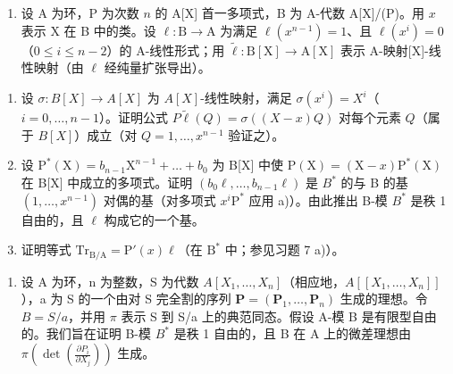 \begin{enumerate}
\def\labelenumi{\arabic{enumi})}
\setcounter{enumi}{7}
\tightlist
\item
  设 A 为环，P 为次数 \(n\) 的 A{[}X{]} 首一多项式，B 为 A-代数 A{[}X{]}/(P)。用 \(x\) 表示 X 在 B 中的类。设 \(\ell: \mathrm{B} \to \mathrm{A}\) 为满足 \(\ell(x^{n-1}) = 1\)、且 \(\ell(x^i) = 0\)（\(0 \leqslant i \leqslant n-2\)）的 A-线性形式；用 \(\tilde{\ell}: \mathrm{B}[\mathrm{X}] \to \mathrm{A}[\mathrm{X}]\) 表示 A-映射{[}X{]}-线性映射（由 \(\ell\) 经纯量扩张导出）。
\end{enumerate}

\begin{enumerate}
\def\labelenumi{\alph{enumi})}
\item
  设 \(\sigma : B[X] \to A[X]\) 为 \(A[X]\)-线性映射，满足 \(\sigma(x^i) = X^i\)（\(i = 0, \ldots, n - 1\)）。证明公式 \(P\tilde{\ell}(Q) = \sigma((X - x)Q)\) 对每个元素 \(Q\)（属于 \(B[X]\)）成立（对 \(Q = 1, \ldots, x^{n-1}\) 验证之）。
\item
  设 \(\mathrm{P}^{*}(\mathrm{X}) = b_{n-1}\mathrm{X}^{n-1} + \ldots + b_{0}\) 为 B{[}X{]} 中使 \(\mathrm{P}(\mathrm{X}) = (\mathrm{X} - x)\mathrm{P}^{*}(\mathrm{X})\) 在 B{[}X{]} 中成立的多项式。证明 \((b_{0}\ell, \ldots, b_{n-1}\ell)\) 是 \(B^{*}\) 的与 B 的基 \((1, \ldots, x^{n-1})\) 对偶的基（对多项式 \(x^{i}\mathrm{P}^{*}\) 应用 a)）。由此推出 B-模 \(B^{*}\) 是秩 1 自由的，且 \(\ell\) 构成它的一个基。
\item
  证明等式 \(\mathrm{Tr}_{\mathrm{B / A}} = \mathrm{P}'(x)\ell\)（在 \(\mathrm{B}^*\) 中；参见习题 7 a)）。
\end{enumerate}

\begin{enumerate}
\def\labelenumi{\arabic{enumi})}
\setcounter{enumi}{8}
\tightlist
\item
  设 A 为环，n 为整数，S 为代数 \(A[X_{1},\ldots,X_{n}]\)（相应地，\(A[[X_{1},\ldots,X_{n}]]\)），a 为 S 的一个由对 S 完全割的序列 \(\mathbf{P}=(\mathbf{P}_{1},\ldots,\mathbf{P}_{n})\) 生成的理想。令 \(B=S/a\)，并用 \(\pi\) 表示 S 到 S/a 上的典范同态。假设 A-模 B 是有限型自由的。我们旨在证明 B-模 \(B^{*}\) 是秩 1 自由的，且 B 在 A 上的微差理想由 \(\pi(\det(\frac{\partial P_{i}}{\partial X_{j}}))\) 生成。
\end{enumerate}

